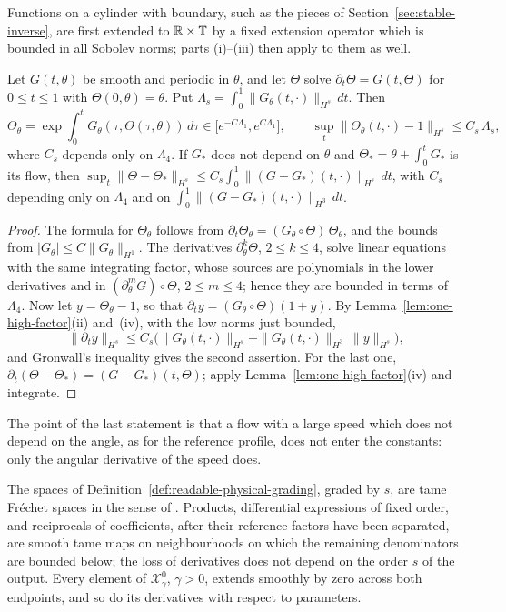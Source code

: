 Functions on a cylinder with boundary, such as the pieces of
Section~\ref{sec:stable-inverse}, are first extended to
$\mathbb R\times\mathbb T$ by a fixed extension operator which is bounded in all
Sobolev norms; parts (i)--(iii) then apply to them as well.

\begin{lemma}\label{lem:circle-flow}
Let $G(t,\theta)$ be smooth and periodic in $\theta$, and let
$\Theta$ solve $\partial_t\Theta=G(t,\Theta)$ for $0\le t\le1$ with
$\Theta(0,\theta)=\theta$. Put
$\Lambda_s=\int_0^1\|G_\theta(t,\cdot)\|_{H^s}\,dt$. Then
\[
 \Theta_\theta=\exp\int_0^tG_\theta(\tau,\Theta(\tau,\theta))\,d\tau
 \in\bigl[e^{-C\Lambda_1},e^{C\Lambda_1}\bigr],
 \qquad
 \sup_t\|\Theta_\theta(t,\cdot)-1\|_{H^s}\le C_s\,\Lambda_s ,
\]
where $C_s$ depends only on $\Lambda_4$. If $G_*$ does not depend on
$\theta$ and $\Theta_*=\theta+\int_0^tG_*$ is its flow, then
$\sup_t\|\Theta-\Theta_*\|_{H^s}
\le C_s\int_0^1\|(G-G_*)(t,\cdot)\|_{H^s}\,dt$, with $C_s$ depending
only on $\Lambda_4$ and on $\int_0^1\|(G-G_*)(t,\cdot)\|_{H^3}\,dt$.
\end{lemma}

\begin{proof}
The formula for $\Theta_\theta$ follows from
$\partial_t\Theta_\theta=(G_\theta\circ\Theta)\,\Theta_\theta$, and
the bounds from $|G_\theta|\le C\|G_\theta\|_{H^1}$. The derivatives
$\partial_\theta^k\Theta$, $2\le k\le4$, solve linear equations with
the same integrating factor, whose sources are polynomials in the
lower derivatives and in $(\partial_\theta^mG)\circ\Theta$,
$2\le m\le4$; hence they are bounded in terms of $\Lambda_4$. Now let
$y=\Theta_\theta-1$, so that
$\partial_ty=(G_\theta\circ\Theta)(1+y)$. By
Lemma~\ref{lem:one-high-factor}(ii) and~(iv), with the low norms just
bounded,
\[
 \|\partial_ty\|_{H^s}
 \le C_s\bigl(\|G_\theta(t,\cdot)\|_{H^s}
 +\|G_\theta(t,\cdot)\|_{H^3}\,\|y\|_{H^s}\bigr),
\]
and Gronwall's inequality gives the second assertion. For the last
one, $\partial_t(\Theta-\Theta_*)=(G-G_*)(t,\Theta)$; apply
Lemma~\ref{lem:one-high-factor}(iv) and integrate.
\end{proof}

The point of the last statement is that a flow with a large speed
which does not depend on the angle, as for the reference profile, does
not enter the constants: only the angular derivative of the speed
does.

\begin{lemma}
\label{prop:full-physical-tame}
The spaces of Definition~\ref{def:readable-physical-grading}, graded by
$s$, are tame Fr\'echet spaces in the sense of
\cite{Hamilton1982}. Products, differential expressions of fixed
order, and reciprocals of coefficients, after their reference factors
have been separated, are smooth tame maps on neighbourhoods on which
the remaining denominators are bounded below; the loss of derivatives
does not depend on the order $s$ of the output. Every element of
$\mathcal X^0_\gamma$, $\gamma>0$, extends smoothly by zero across
both endpoints, and so do its derivatives with respect to parameters.
\end{lemma}

